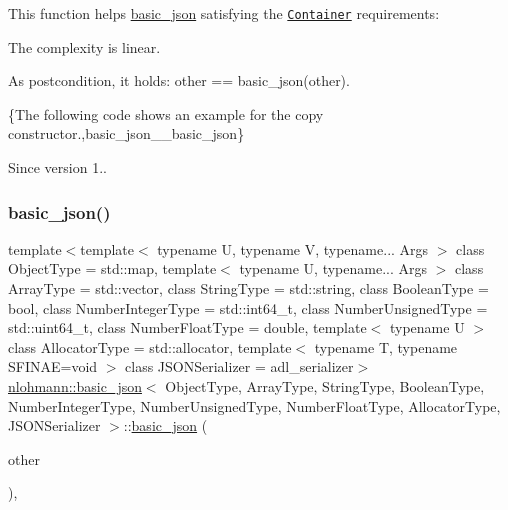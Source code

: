 This function helps {\ttfamily \mbox{\hyperlink{classnlohmann_1_1basic__json}{basic\+\_\+json}}} satisfying the \href{https://en.cppreference.com/w/cpp/named_req/Container}{\tt Container} requirements\+:
\begin{DoxyItemize}
\item The complexity is linear.
\item As postcondition, it holds\+: {\ttfamily other == basic\+\_\+json(other)}.
\end{DoxyItemize}

\{The following code shows an example for the copy constructor.,basic\+\_\+json\+\_\+\+\_\+basic\+\_\+json\}

\begin{DoxySince}{Since}
version 1.. 
\end{DoxySince}
\mbox{\label{classnlohmann_1_1basic__json_a9a06d1efd50a00f4889f831f851ce124}} 
\subsubsection{\texorpdfstring{basic\+\_\+json()}{basic\_json()}\hspace{0.1cm}{\footnotesize\ttfamily [9/9]}}
{\footnotesize\ttfamily template$<$template$<$ typename U, typename V, typename... Args $>$ class Object\+Type = std\+::map, template$<$ typename U, typename... Args $>$ class Array\+Type = std\+::vector, class String\+Type  = std\+::string, class Boolean\+Type  = bool, class Number\+Integer\+Type  = std\+::int64\+\_\+t, class Number\+Unsigned\+Type  = std\+::uint64\+\_\+t, class Number\+Float\+Type  = double, template$<$ typename U $>$ class Allocator\+Type = std\+::allocator, template$<$ typename T, typename S\+F\+I\+N\+A\+E=void $>$ class J\+S\+O\+N\+Serializer = adl\+\_\+serializer$>$ \\
\mbox{\hyperlink{classnlohmann_1_1basic__json}{nlohmann\+::basic\+\_\+json}}$<$ Object\+Type, Array\+Type, String\+Type, Boolean\+Type, Number\+Integer\+Type, Number\+Unsigned\+Type, Number\+Float\+Type, Allocator\+Type, J\+S\+O\+N\+Serializer $>$\+::\mbox{\hyperlink{classnlohmann_1_1basic__json}{basic\+\_\+json}} (\begin{DoxyParamCaption}\item[{\mbox{\hyperlink{classnlohmann_1_1basic__json}{basic\+\_\+json}}$<$ Object\+Type, Array\+Type, String\+Type, Boolean\+Type, Number\+Integer\+Type, Number\+Unsigned\+Type, Number\+Float\+Type, Allocator\+Type, J\+S\+O\+N\+Serializer $>$ \&\&}]{other }\end{DoxyParamCaption})\hspace{0.3cm}{\ttfamily [inline]}, {\ttfamily [noexcept]}}



